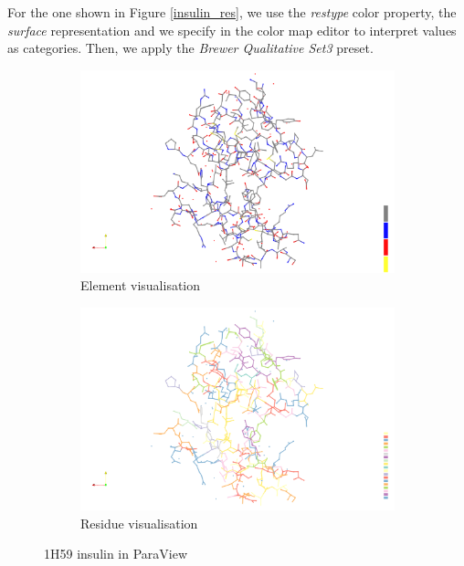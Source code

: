 \documentclass[openany]{article}
\begin{document}
For the one shown in Figure \ref{insulin_res}, we use the \textit{restype} color property, the \textit{surface} representation and we specify in the color map editor to interpret values as categories. Then, we apply the \textit{Brewer Qualitative Set3} preset.

\begin{figure}[h]
	\centering
	\begin{subfigure}{.5\textwidth}
		\centering
		\includegraphics[width=\linewidth]{Proteins/1h59_insulin_el_pv}
		\caption{Element visualisation}
	\end{subfigure}%
	\begin{subfigure}{.5\textwidth}
		\centering
		\includegraphics[width=\linewidth]{Proteins/1h59_insulin_res_pv}
		\caption{Residue visualisation}
	\end{subfigure}
	\caption{1H59 insulin in ParaView}
\end{figure}
\end{document}
